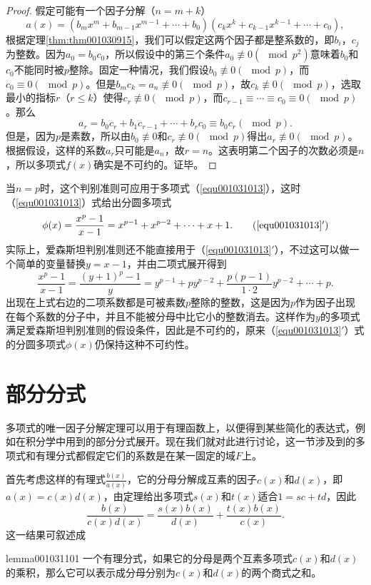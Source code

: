 \begin{proof}
假定可能有一个因子分解（$n=m+k$）
\[
a(x)=(b_mx^m+b_{m-1}x^{m-1}+\cdots + b_0)(c_kx^k+c_{k-1}x^{k-1} + \cdots + c_0),
\]
根据定理\ref{thm:thm001030915}，我们可以假定这两个因子都是整系数的，即$b_i$，$c_j$为整数。因为$a_0=b_0c_0$，所以假设中的第三个条件$a_0 \not\equiv 0 (\mod{p^2})$意味着$b_0$和$c_0$不能同时被$p$整除。固定一种情况，我们假设$b_0 \not\equiv 0(\mod{p})$，而$c_0 \equiv 0(\mod{p})$。但是$b_mc_k = a_n \not\equiv 0(\mod{p})$，故$c_k \not\equiv 0(\mod{p})$，选取最小的指标$r$（$r \le k$）使得$c_r \not\equiv 0(\mod{p})$，而$c_{r-1}\equiv\cdots\equiv c_0 \equiv 0(\mod{p})$。那么
\[
a_r = b_0c_r + b_1c_{r-1} + \cdots + b_rc_0 \equiv b_0c_r(\mod{p}).
\]
但是，因为$p$是素数，所以由$b_0 \not\equiv 0$和$c_r \not\equiv 0(\mod{p})$得出$a_r \not\equiv 0(\mod{p})$。根据假设，这样的系数$a_r$只可能是$a_n$，故$r=n$。这表明第二个因子的次数必须是$n$，所以多项式$f(x)$确实是不可约的。证毕。
\end{proof}

当$n=p$时，这个判别准则可应用于多项式（\ref{equ001031013}），这时（\ref{equ001031013}）式给出分圆多项式
\begin{equation}
\phi(x)=\frac{x^p-1}{x-1}=x^{p-1}+x^{p-2}+\cdots +x+1. \tag{\ref{equ001031013}$'$}
\end{equation}
实际上，爱森斯坦判别准则还不能直接用于（\ref{equ001031013}$'$），不过这可以做一个简单的变量替换$y = x - 1$，并由二项式展开得到
\[
\frac{x^p-1}{x-1} = \frac{(y+1)^p-1}{y} = y^{p-1} + py^{p-2} + \frac{p(p-1)}{1 \cdot 2}y^{p-2} + \cdots + p.
\]
出现在上式右边的二项系数都是可被素数$p$整除的整数，这是因为$p$作为因子出现在每个系数的分子中，并且不能被分母中比它小的整数消去。这样作为$y$的多项式满足爱森斯坦判别准则的假设条件，因此是不可约的，原来（\ref{equ001031013}$'$）式的分圆多项式$\phi(x)$仍保持这种不可约性。


\section{部分分式}\label{subsection0010311}
多项式的唯一因子分解定理可以用于有理函数上，以便得到某些简化的表达式，例如在积分学中用到的部分分式展开。现在我们就对此进行讨论，这一节涉及到的多项式和有理分式都假定它们的系数是在某一固定的域$F$上。

首先考虑这样的有理式$\frac{b(x)}{a(x)}$，它的分母分解成互素的因子$c(x)$和$d(x)$，即$a(x)=c(x)d(x)$，由定理给出多项式$s(x)$和$t(x)$适合$1 = sc+td$，因此
\begin{equation}\label{equ001031114}
\frac{b(x)}{c(x)d(x)} = \frac{s(x)b(x)}{d(x)} + \frac{t(x)b(x)}{c(x)}.
\end{equation}
这一结果可叙述成
\begin{lemma}{}{lemma001031101}
一个有理分式，如果它的分母是两个互素多项式$c(x)$和$d(x)$的乘积，那么它可以表示成分母分别为$c(x)$和$d(x)$的两个商式之和。
\end{lemma}

